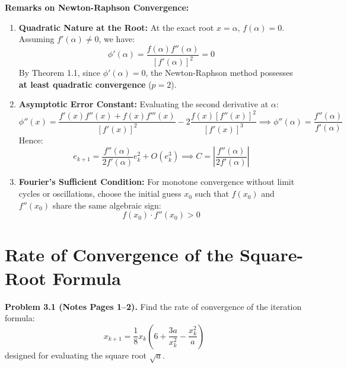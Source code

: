 \documentclass[11pt,a4paper]{article}
\numberwithin{equation}{section}
\begin{document}
\begin{rembox}
\textbf{Remarks on Newton-Raphson Convergence:}
\begin{enumerate}[leftmargin=1.5em]
    \item \textbf{Quadratic Nature at the Root:} At the exact root $x = \alpha$, $f(\alpha) = 0$. Assuming $f'(\alpha) \ne 0$, we have:
    \begin{equation}
        \phi'(\alpha) = \frac{f(\alpha) f''(\alpha)}{[f'(\alpha)]^2} = 0
    \end{equation}
    By Theorem 1.1, since $\phi'(\alpha) = 0$, the Newton-Raphson method possesses \textbf{at least quadratic convergence} ($p = 2$).
    \item \textbf{Asymptotic Error Constant:} Evaluating the second derivative at $\alpha$:
    \begin{equation}
        \phi''(x) = \frac{f'(x) f''(x) + f(x) f'''(x)}{[f'(x)]^2} - 2\frac{f(x)[f''(x)]^2}{[f'(x)]^3} \implies \phi''(\alpha) = \frac{f''(\alpha)}{f'(\alpha)}
    \end{equation}
    Hence:
    \begin{equation}
        e_{k+1} = \frac{f''(\alpha)}{2 f'(\alpha)} e_k^2 + O(e_k^3) \implies C = \left|\frac{f''(\alpha)}{2 f'(\alpha)}\right|
    \end{equation}
    \item \textbf{Fourier's Sufficient Condition:} For monotone convergence without limit cycles or oscillations, choose the initial guess $x_0$ such that $f(x_0)$ and $f''(x_0)$ share the same algebraic sign:
    \begin{equation}
        f(x_0) \cdot f''(x_0) > 0
    \end{equation}
\end{enumerate}
\end{rembox}

\section{Rate of Convergence of the Square-Root Formula}

\begin{thmbox}
\textbf{Problem 3.1 (Notes Pages 1--2).}
Find the rate of convergence of the iteration formula:
\begin{equation}
    x_{k+1} = \frac{1}{8} x_k \left( 6 + \frac{3a}{x_k^2} - \frac{x_k^2}{a} \right)
\end{equation}
designed for evaluating the square root $\sqrt{a}$.
\end{thmbox}
\end{document}
